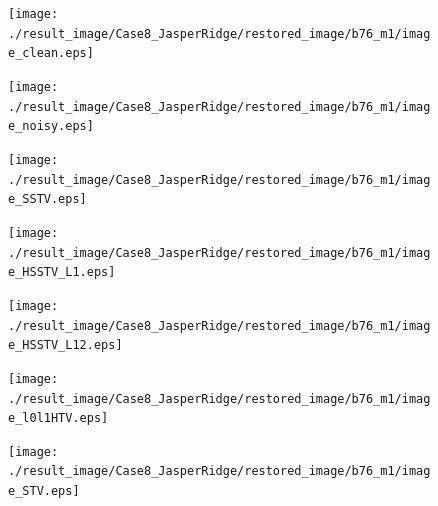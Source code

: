 \begin{figure}[t]
	\begin{center}
		\begin{minipage}{0.125\hsize}
			\centerline{\texttt{[image: ./result\_image/Case8\_JasperRidge/restored\_image/b76\_m1/image\_clean.eps]}} %
		\end{minipage}
		\begin{minipage}{0.125\hsize}
			\centerline{\texttt{[image: ./result\_image/Case8\_JasperRidge/restored\_image/b76\_m1/image\_noisy.eps]}} %
		\end{minipage}
		\begin{minipage}{0.125\hsize}
			\centerline{\texttt{[image: ./result\_image/Case8\_JasperRidge/restored\_image/b76\_m1/image\_SSTV.eps]}} %
		\end{minipage}
		\begin{minipage}{0.125\hsize}
			\centerline{\texttt{[image: ./result\_image/Case8\_JasperRidge/restored\_image/b76\_m1/image\_HSSTV\_L1.eps]}} %
		\end{minipage}
		\begin{minipage}{0.125\hsize}
			\centerline{\texttt{[image: ./result\_image/Case8\_JasperRidge/restored\_image/b76\_m1/image\_HSSTV\_L12.eps]}} %
		\end{minipage}
		\begin{minipage}{0.125\hsize}
			\centerline{\texttt{[image: ./result\_image/Case8\_JasperRidge/restored\_image/b76\_m1/image\_l0l1HTV.eps]}} %
		\end{minipage}
		\begin{minipage}{0.125\hsize}
			\centerline{\texttt{[image: ./result\_image/Case8\_JasperRidge/restored\_image/b76\_m1/image\_STV.eps]}} %
		\end{minipage}
		\begin{minipage}{0.050\hsize}
			\centerline{\hspace{\hsize}} %
		\end{minipage}
		
		\vspace{1mm}
		

\end{center}
\end{figure}
